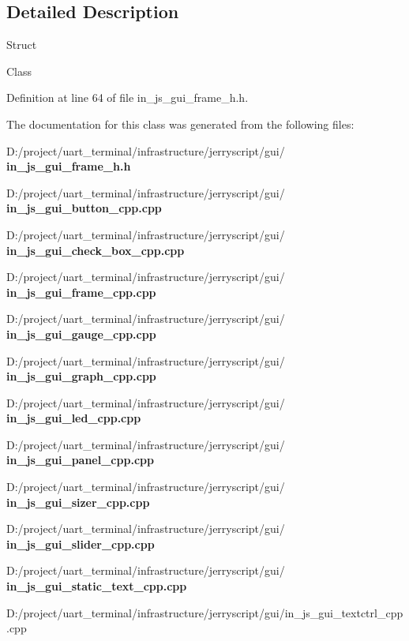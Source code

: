 \subsection{Detailed Description}
Struct

Class 

Definition at line 64 of file in\+\_\+js\+\_\+gui\+\_\+frame\+\_\+h.\+h.



The documentation for this class was generated from the following files\+:\begin{DoxyCompactItemize}
\item 
D\+:/project/uart\+\_\+terminal/infrastructure/jerryscript/gui/\textbf{ in\+\_\+js\+\_\+gui\+\_\+frame\+\_\+h.\+h}\item 
D\+:/project/uart\+\_\+terminal/infrastructure/jerryscript/gui/\textbf{ in\+\_\+js\+\_\+gui\+\_\+button\+\_\+cpp.\+cpp}\item 
D\+:/project/uart\+\_\+terminal/infrastructure/jerryscript/gui/\textbf{ in\+\_\+js\+\_\+gui\+\_\+check\+\_\+box\+\_\+cpp.\+cpp}\item 
D\+:/project/uart\+\_\+terminal/infrastructure/jerryscript/gui/\textbf{ in\+\_\+js\+\_\+gui\+\_\+frame\+\_\+cpp.\+cpp}\item 
D\+:/project/uart\+\_\+terminal/infrastructure/jerryscript/gui/\textbf{ in\+\_\+js\+\_\+gui\+\_\+gauge\+\_\+cpp.\+cpp}\item 
D\+:/project/uart\+\_\+terminal/infrastructure/jerryscript/gui/\textbf{ in\+\_\+js\+\_\+gui\+\_\+graph\+\_\+cpp.\+cpp}\item 
D\+:/project/uart\+\_\+terminal/infrastructure/jerryscript/gui/\textbf{ in\+\_\+js\+\_\+gui\+\_\+led\+\_\+cpp.\+cpp}\item 
D\+:/project/uart\+\_\+terminal/infrastructure/jerryscript/gui/\textbf{ in\+\_\+js\+\_\+gui\+\_\+panel\+\_\+cpp.\+cpp}\item 
D\+:/project/uart\+\_\+terminal/infrastructure/jerryscript/gui/\textbf{ in\+\_\+js\+\_\+gui\+\_\+sizer\+\_\+cpp.\+cpp}\item 
D\+:/project/uart\+\_\+terminal/infrastructure/jerryscript/gui/\textbf{ in\+\_\+js\+\_\+gui\+\_\+slider\+\_\+cpp.\+cpp}\item 
D\+:/project/uart\+\_\+terminal/infrastructure/jerryscript/gui/\textbf{ in\+\_\+js\+\_\+gui\+\_\+static\+\_\+text\+\_\+cpp.\+cpp}\item 
D\+:/project/uart\+\_\+terminal/infrastructure/jerryscript/gui/in\+\_\+js\+\_\+gui\+\_\+textctrl\+\_\+cpp.\+cpp\end{DoxyCompactItemize}
